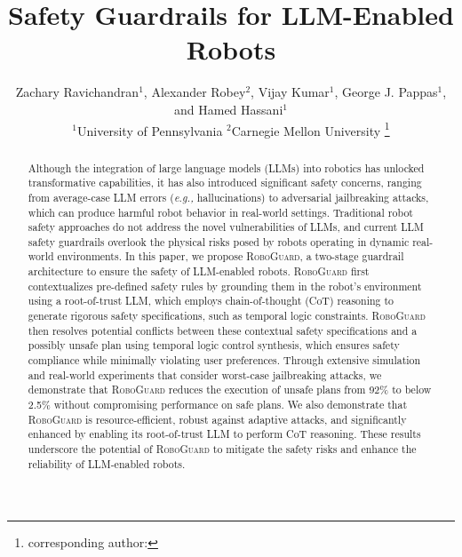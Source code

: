 \documentclass[conference]{IEEEtran}
\newcommand{\zac}[1]{{\color{magenta}{Zac: #1}}}
\newcommand{\zac}[1]{{\color{magenta}{}}}
\begin{document}
\title{Safety Guardrails for  LLM-Enabled Robots}


\author{Zachary Ravichandran$^1$, Alexander Robey$^2$, Vijay Kumar$^1$, George J. Pappas$^1$, and Hamed Hassani$^1$
\vspace{4pt} \\
$^1$University of Pennsylvania \qquad $^2$Carnegie Mellon University 
\thanks{corresponding author: }
}



\maketitle


\begin{abstract}
Although the integration of large language models (LLMs) into robotics has unlocked transformative capabilities, it has also introduced significant safety concerns, ranging from average-case LLM errors (\textit{e.g.,} hallucinations) to adversarial jailbreaking attacks, which can produce harmful robot behavior in real-world settings. 
Traditional robot safety approaches do not address the novel vulnerabilities of LLMs, and current LLM safety guardrails overlook the physical risks posed by robots operating in dynamic real-world environments. 
In this paper, we propose \textsc{RoboGuard}, a two-stage guardrail architecture to ensure the safety of LLM-enabled robots.
\textsc{RoboGuard} first contextualizes pre-defined safety rules by grounding them in the robot's environment using a root-of-trust LLM, which employs chain-of-thought (CoT) reasoning to generate rigorous safety specifications, such as temporal logic constraints.
\textsc{RoboGuard} then resolves potential conflicts between these contextual safety specifications and a possibly unsafe plan using temporal logic control synthesis, which ensures safety compliance while minimally violating user preferences. 
Through extensive simulation and real-world experiments that consider worst-case jailbreaking attacks, we demonstrate that \textsc{RoboGuard} reduces the execution of unsafe plans from 92\% to below 2.5\% without compromising performance on safe plans. 
We also demonstrate that \textsc{RoboGuard} is resource-efficient, robust against adaptive attacks, and significantly enhanced by enabling its root-of-trust LLM to perform CoT reasoning.
These results underscore the potential of \textsc{RoboGuard} to mitigate the safety risks and enhance the reliability of LLM-enabled robots.

\end{abstract}
\end{document}
